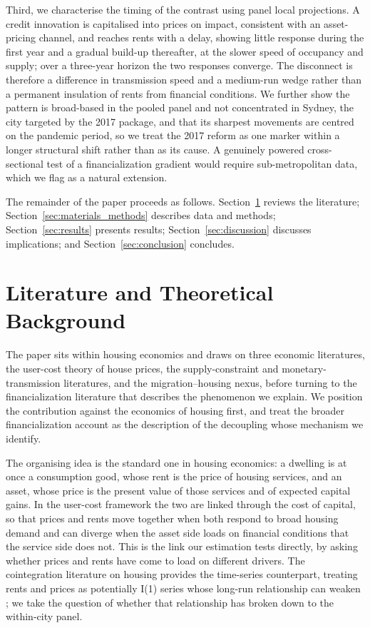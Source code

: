 \documentclass[preprint,11pt,authoryear]{elsarticle}
\begin{document}
Third, we characterise the timing of the contrast using panel
local projections. A credit innovation is capitalised into prices on
impact, consistent with an asset-pricing channel, and reaches rents
with a delay, showing little response during the first year and a
gradual build-up thereafter, at the slower speed of occupancy
and supply; over a three-year horizon the two responses converge. The
disconnect is therefore a difference in transmission speed and a
medium-run wedge rather than a permanent insulation of rents from
financial conditions. We further show the pattern is broad-based in the
pooled panel and not concentrated in Sydney, the city targeted
by the 2017 package, and that its sharpest movements are centred on the
pandemic period, so we treat the 2017 reform as one marker within a
longer structural shift rather than as its cause. A genuinely
powered cross-sectional test of a financialization gradient would require
sub-metropolitan data, which we flag as a natural extension.

The remainder of the paper proceeds as follows.
Section~\ref{sec:lit} reviews the literature;
Section~\ref{sec:materials_methods} describes data and methods;
Section~\ref{sec:results} presents results;
Section~\ref{sec:discussion} discusses implications; and
Section~\ref{sec:conclusion} concludes.

\section{Literature and Theoretical Background}
\label{sec:lit}

The paper sits within housing economics and draws on three economic
literatures, the user-cost theory of house prices, the supply-constraint
and monetary-transmission literatures, and the migration--housing nexus,
before turning to the financialization literature that describes the
phenomenon we explain. We position the contribution against the economics
of housing first, and treat the broader financialization account as the
description of the decoupling whose mechanism we identify.

The organising idea is the standard one in housing economics: a dwelling
is at once a consumption good, whose rent is the price of housing
services, and an asset, whose price is the present value of those services
and of expected capital gains. In the user-cost framework the two are
linked through the cost of capital, so that prices and rents move together
when both respond to broad housing demand and can diverge when the
asset side loads on financial conditions that the service side does not.
This is the link our estimation tests directly, by asking whether prices
and rents have come to load on different drivers. The cointegration
literature on housing provides the time-series counterpart, treating rents
and prices as potentially I(1) series whose long-run relationship can
weaken \citep{kenny1999modelling}; we take the question of whether that
relationship has broken down to the within-city panel.
\end{document}
